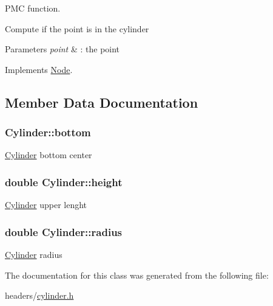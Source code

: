 \-P\-M\-C function. 

\-Compute if the point is in the cylinder


\begin{DoxyParams}{\-Parameters}
{\em point} & \-: the point \\
\hline
\end{DoxyParams}


\-Implements \hyperlink{class_node_aeecdf01a88be40840b65eb34cecc7a3c}{\-Node}.



\subsection{\-Member \-Data \-Documentation}
\hypertarget{class_cylinder_ad6d4d4070807f4680a250ec1227fc482}{
\subsubsection[{bottom}]{ {\bf \-Cylinder\-::bottom}}}
\label{class_cylinder_ad6d4d4070807f4680a250ec1227fc482}
\hyperlink{class_cylinder}{\-Cylinder} bottom center \hypertarget{class_cylinder_a211cebc37f1025850cdacffe1badb578}{
\subsubsection[{height}]{\setlength{\rightskip}{0pt plus 5cm}double {\bf \-Cylinder\-::height}}}
\label{class_cylinder_a211cebc37f1025850cdacffe1badb578}
\hyperlink{class_cylinder}{\-Cylinder} upper lenght \hypertarget{class_cylinder_a8a825799285bcf60b49b8aef0459b498}{
\subsubsection[{radius}]{\setlength{\rightskip}{0pt plus 5cm}double {\bf \-Cylinder\-::radius}}}
\label{class_cylinder_a8a825799285bcf60b49b8aef0459b498}
\hyperlink{class_cylinder}{\-Cylinder} radius 

\-The documentation for this class was generated from the following file\-:\begin{DoxyCompactItemize}
\item 
headers/\hyperlink{cylinder_8h}{cylinder.\-h}\end{DoxyCompactItemize}
